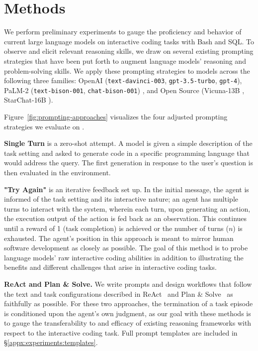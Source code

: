 \section{Methods}
\label{sec:methods}
We perform preliminary experiments to gauge the proficiency and behavior of current large language models on interactive coding tasks with Bash and SQL.
To observe and elicit relevant reasoning skills, we draw on several existing prompting strategies that have been put forth to augment language models' reasoning and problem-solving skills.
We apply these prompting strategies to models across the following three families: OpenAI (\texttt{text-davinci-003}, \texttt{gpt-3.5-turbo}, \texttt{gpt-4}), PaLM-2 (\texttt{text-bison-001}, \texttt{chat-bison-001}) \cite{anil2023palm}, and Open Source (Vicuna-13B \cite{vicuna2023}, StarChat-16B \cite{li2023starcoder}).

Figure~\ref{fig:prompting-approaches} visualizes the four adjusted prompting strategies we evaluate on \benchmark{}.

\textbf{Single Turn} is a zero-shot attempt. A model is given a simple description of the task setting and asked to generate code in a specific programming language that would address the query. The first generation in response to the user's question is then evaluated in the \benchmark{} environment.



\textbf{"Try Again"} is an iterative feedback set up. In the initial message, the agent is informed of the task setting and its interactive nature; an agent has multiple turns to interact with the system, wherein each turn, upon generating an action, the execution output of the action is fed back as an observation. This continues until a reward of 1 (task completion) is achieved or the number of turns ($n$) is exhausted. The agent's position in this approach is meant to mirror human software development as closely as possible. The goal of this method is to probe language models' raw interactive coding abilities in addition to illustrating the benefits and different challenges that arise in interactive coding tasks.

\textbf{ReAct and Plan \& Solve.} We write prompts and design workflows that follow the text and task configurations described in ReAct~\cite{yao2023react} and Plan \& Solve~\cite{wang2023planandsolve} as faithfully as possible. For these two approaches, the termination of a task episode is conditioned upon the agent's own judgment, as our goal with these methods is to gauge the transferability to and efficacy of existing reasoning frameworks with respect to the interactive coding task.
Full prompt templates are included in \S\ref{appx:experiments:templates}.
